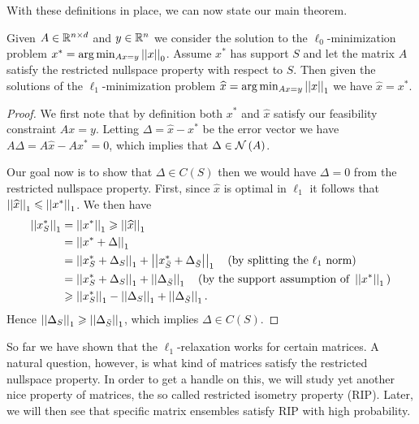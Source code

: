 \documentclass[11pt]{article}
\begin{document}
With these definitions in place, we can now state our main theorem.

\begin{theorem}
    Given \(A \in \mathbb R^{n\times d}\) and \(y\in\mathbb R^n\) we consider the solution to the \(\ell_0\)-minimization problem \(x^\ast=\arg\min_{A x=y}\left|\left|x\right|\right|_{0}\). Assume \(x^\ast\) has support \(S\) and let the matrix \(A\) satisfy the restricted nullspace property with respect to \(S\). Then given the solutions of the \(\ell_1\)-minimization problem \(\widehat{x}=\arg\min_{A x=y}\left|\left|x\right|\right|_{1}\) we have \(\widehat{x}=x^\ast\).
\end{theorem}

\begin{proof}
We first note that by definition both \(x^\ast\) and \(\widehat{x}\) satisfy our feasibility constraint \(A x=y\). Letting \(\Delta=\widehat{x}-x^\ast\) be the error vector we have \(A \Delta=A \widehat{x}-A x^\ast=0\), which implies that \(\Delta\in\mathcal N\left(A\right)\).

Our goal now is to show that \(\Delta\in C(S)\) then we would have \(\Delta=0\) from the restricted nullspace property. First, since \(\widehat{x}\) is optimal in \(\ell_1\) it follows that \(\left|\left|\widehat x\right|\right|_1\leqslant\left|\left|x^\ast\right|\right|_1\). We then have
\[\begin{aligned}
    \left|\left|x^\ast_S\right|\right|_1 &= \left|\left|x^\ast\right|\right|_1\geqslant \left|\left|\widehat x\right|\right|_1\\
    &= \left|\left|x^\ast+\Delta\right|\right|_1\\
    &= \left|\left|x^\ast_S+\Delta_S\right|\right|_1+\left|\left|x^\ast_{\bar S}+\Delta_{\bar S}\right|\right|_1\quad\textnormal{(by splitting the }\ell_1\textnormal{ norm)}\\
    &= \left|\left|x^\ast_S+\Delta_S\right|\right|_1+\left|\left|\Delta_{\bar S}\right|\right|_1\quad\textnormal{(by the support assumption of }\left|\left|x^\ast\right|\right|_1\textnormal{)}\\
    &\geqslant \left|\left|x^\ast_S\right|\right|_1-\left|\left|\Delta_S\right|\right|_1+\left|\left|\Delta_{\bar S}\right|\right|_1.
\end{aligned}\]
Hence \(\left|\left|\Delta_S\right|\right|_1\geqslant\left|\left|\Delta_{\bar S}\right|\right|_1\), which implies \(\Delta\in C(S)\).
\end{proof}

So far we have shown that the \(\ell_1\)-relaxation works for certain matrices. A natural question, however, is what kind of matrices satisfy the restricted nullspace property. In order to get a handle on this, we will study yet another nice property of matrices, the so called restricted isometry property (RIP). Later, we will then see that specific matrix ensembles satisfy RIP with high probability.
\end{document}
